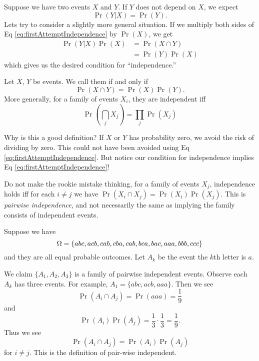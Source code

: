 \M
Suppose we have two events $X$ and $Y$. If $Y$ does not depend on $X$,
we expect
\begin{equation}\label{eq:firstAttemptIndependence}
\Pr(Y|X)=\Pr(Y).
\end{equation}
Lets try to consider a slightly more general situation. If we multiply
both sides of Eq \eqref{eq:firstAttemptIndependence} by $\Pr(X)$, we get
\begin{equation}
\begin{split}
\Pr(Y|X)\Pr(X)&=\Pr(X\cap Y)\\
&=\Pr(Y)\Pr(X)
\end{split}
\end{equation}
which gives us the desired condition for ``independence.''

Let $X$, $Y$ be events. We call them  if and
only if 
\begin{equation}
\Pr(X\cap Y)=\Pr(X)\Pr(Y).
\end{equation}
More generally, for a family of events $X_{i}$, they are independent iff
\begin{equation}
\Pr\left(\bigcap_{j}X_{j}\right)=\prod_{j}\Pr(X_{j})
\end{equation}

Why is this a good definition? If $X$ or $Y$ has probability zero, we
avoid the risk of dividing by zero. This could not have been avoided
using Eq \eqref{eq:firstAttemptIndependence}. But notice our condition
for independence implies Eq \eqref{eq:firstAttemptIndependence}!

 Do not make the rookie mistake thinking, for a family of
events $X_{j}$, independence holds iff for each $i\neq j$ we have
$\Pr(X_{i}\cap X_j)=\Pr(X_i)\Pr(X_j)$. This is \emph{pairwise
independence}, and not necessarily the same as implying the family
consists of independent events.

Suppose we have 
\begin{equation}
\Omega = \{ abc,acb,cab,cba,cab,bca,bac,aaa,bbb,ccc \}
\end{equation}
and they are all equal probable outcomes. Let $A_{k}$ be the event the
$k$th letter is $a$. 

We claim $\{A_1,A_2,A_3\}$ is a family of pairwise independent
events. Observe each $A_k$ has three events. For example,
$A_1=\{abc,acb,aaa\}$. Then we see
\begin{equation}
\Pr(A_{i}\cap A_{j})=\Pr(aaa)=\frac{1}{9}
\end{equation}
and
\begin{equation}
\Pr(A_i)\Pr(A_j)=\frac{1}{3}\cdot\frac{1}{3}=\frac{1}{9}.
\end{equation}
Thus we see
\begin{equation}
\Pr(A_i\cap A_j)=\Pr(A_i)\Pr(A_j)
\end{equation}
for $i\neq j$. This is the definition of pair-wise independent.

